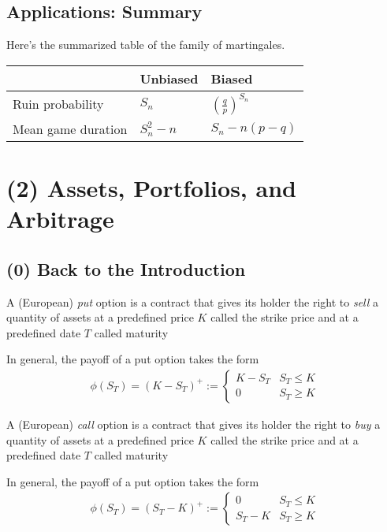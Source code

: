 \documentclass[12pt]{extarticle}
\newcommand{\<}{\langle}
\renewcommand{\>}{\rangle}
\theoremstyle{definition}
\begin{document}
\newpage
\subsection{Applications: Summary}
Here's the summarized table of the family of martingales.\\ 
\begin{tcolorbox}[enhanced, drop fuzzy shadow, title=Table 1.1: List of martingales.]
\begin{center}
  \begin{tabularx}{6in}{| X | X | X |} \hline
    \  & Unbiased & Biased \\ \hline
    Ruin probability & $S_n$ & $\left(\frac{q}{p}\right)^{S_n}$ \\ \hline
    Mean game duration & $S_n^2 -n$ & $S_n -n(p-q)$ \\ \hline
  \end{tabularx}
\end{center}
\end{tcolorbox}
\newpage

\section{(2) Assets, Portfolios, and Arbitrage}
\subsection{(0) Back to the Introduction}
\begin{tcolorbox}[enhanced, drop fuzzy shadow, title=Definition 0.1: Put option]
A (European) \textit{put} option is a contract that gives its holder the right to \textit{sell} a quantity of assets at a predefined price $K$ called the strike price and at a predefined date $T$ called maturity
\end{tcolorbox}
In general, the payoff of a put option takes the form
\begin{align*}
    \phi(S_T)=(K-S_T)^+ :=
    \begin{cases}
    K-S_T  & S_T \leq K \\
    0  & S_T \geq K
    \end{cases}
\end{align*}
\begin{tcolorbox}[enhanced, drop fuzzy shadow, title=Definition 0.2: Call option]
A (European) \textit{call} option is a contract that gives its holder the right to \textit{buy} a quantity of assets at a predefined price $K$ called the strike price and at a predefined date $T$ called maturity
\end{tcolorbox}
In general, the payoff of a put option takes the form
\begin{align*}
    \phi(S_T)=(S_T-K)^+ :=
    \begin{cases}
    0  & S_T \leq K \\
    S_T-K  & S_T \geq K
    \end{cases}
\end{align*}
\end{document}
